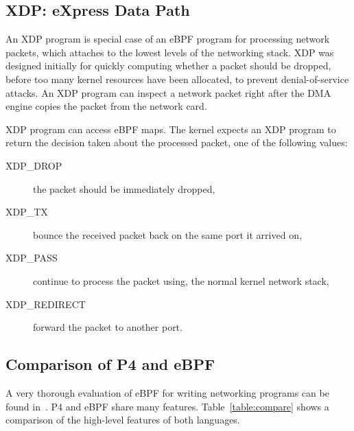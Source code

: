 \subsection{XDP: eXpress Data Path}\label{sec:xdp-background}

An XDP program is special case of an eBPF program for processing
network packets, which attaches to the lowest levels of the networking
stack.  XDP was designed initially for quickly computing whether a
packet should be dropped, before too many kernel resources have been
allocated, to prevent denial-of-service attacks.  An XDP program can
inspect a network packet right after the DMA engine copies the packet
from the network card.

XDP program can access eBPF maps.  The kernel expects an XDP program
to return the decision taken about the processed packet, one of the
following values:

\begin{description}
\item[XDP\_DROP] the packet should be immediately dropped,
\item[XDP\_TX] bounce the received packet back on the same port it arrived on,
\item[XDP\_PASS] continue to process the packet using,
  the normal kernel network stack,
\item[XDP\_REDIRECT] forward the packet to another port.
\end{description}

\subsection{Comparison of P4 and eBPF}

A very thorough evaluation of eBPF for writing networking programs can
be found in~\cite{minao-hspr18}.  P4 and eBPF share many features.
Table~\ref{table:compare} shows a comparison of the high-level
features of both languages.


